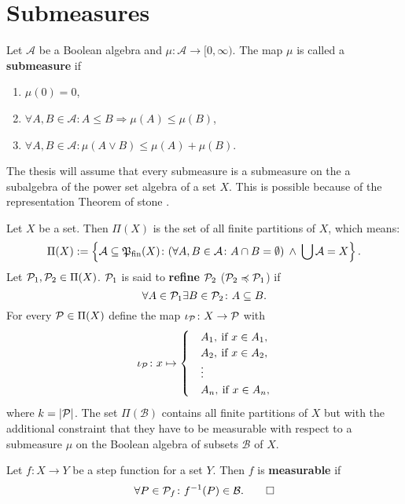 \section{Submeasures}\label{appendixA}

\begin{defin}
  Let $\mathcal{A}$ be a Boolean algebra and $\mu\colon \mathcal{A} \to [0, \infty)$. The map $\mu$ is called a \textbf{submeasure} if
  \begin{enumerate}[label=\roman*.)]
    \item $\mu(0) = 0$,
    \item $\forall A, B \in \mathcal{A}\colon A \leq B \Rightarrow \mu(A) \leq \mu(B)$,
    \item $\forall A, B \in \mathcal{A}\colon \mu(A \lor B) \leq \mu(A) + \mu(B)$.\qedhere
  \end{enumerate}
\end{defin}

The thesis will assume that every submeasure is a submeasure on the a subalgebra of the power set algebra of a set $X$. This is possible because of the representation Theorem of stone \cite{stone}.

\begin{defin}
  Let $X$ be a set. Then $\Pi(X)$ is the set of all finite partitions of $X$, which means:
  \begin{equation*}
    \Pi(X) := \left\{ \mathcal{A} \subseteq \PowSF(X)\colon (\forall A,B \in \mathcal{A}\colon A \cap B = \emptyset) \: \land \: \bigcup\mathcal{A} = X \right\}.
  \end{equation*}
  Let $\P_1, \P_2 \in \Pi(X)$. $\P_1$ is said to \textbf{refine} $\P_2$ ($\P_2 \preccurlyeq \P_1$) if
  \begin{equation*}
    \forall A \in \P_1\exists B \in \P_2\colon A \subseteq B.
  \end{equation*}
  For every $\P \in \Pi(X)$ define the map $\iota_\P\colon X \to \P$ with
  \begin{equation*}
    \iota_\P\colon x \mapsto \begin{cases}
      &A_1, \: \text{if } x \in A_1, \\
      &A_2, \: \text{if } x \in A_2, \\
      &\vdots \\
      &A_n, \: \text{if } x \in A_n,
    \end{cases}
  \end{equation*}
  where $k = \left|\P\right|$.    
  The set $\Pi(\mathcal{B})$ contains all finite partitions of $X$ but with the additional constraint that they have to be measurable with respect to a submeasure $\mu$ on the Boolean algebra of subsets $\mathcal{B}$ of $X$.

  Let $f\colon X \to Y$ be a step function for a set $Y$. Then $f$ is \textbf{measurable} if \[\forall P \in \P_f\colon f^{-1}(P) \in \mathcal{B}.\qedhere\]
\end{defin}


